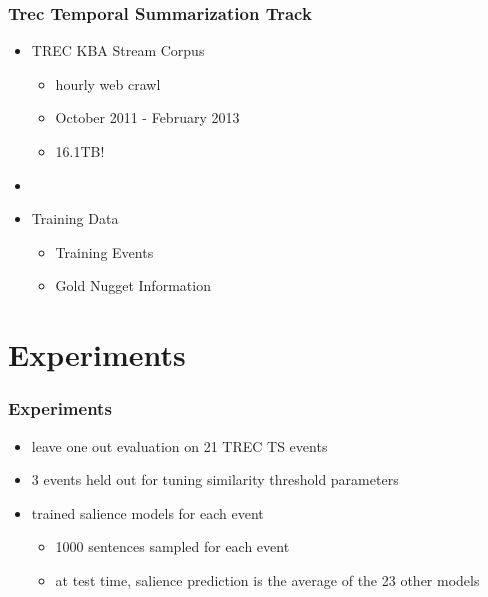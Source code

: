 \documentclass{beamer}
\begin{document}
\begin{frame}
\frametitle{Trec Temporal Summarization Track}
\begin{itemize}
\item TREC KBA Stream Corpus
\begin{itemize}
\item hourly web crawl
\item October 2011 - February 2013
\item 16.1TB!
\end{itemize}
\item[]
\item Training Data
\begin{itemize}
\item Training Events
\item Gold Nugget Information
\end{itemize}
\end{itemize}
\end{frame}



\section{Experiments}

\begin{frame}
    \frametitle{Experiments}
    
    \begin{itemize}
        \pause
        \item leave one out evaluation on 21 TREC TS events
        \pause
        \item 3 events held out for tuning similarity threshold parameters
        \pause
        \item trained salience models for each event
        \pause
        \begin{itemize}
            \item 1000 sentences sampled for each event
            \item at test time, salience prediction is the average of the 
                23 other models
        \end{itemize}
    \end{itemize}
    
\end{frame}
\end{document}
